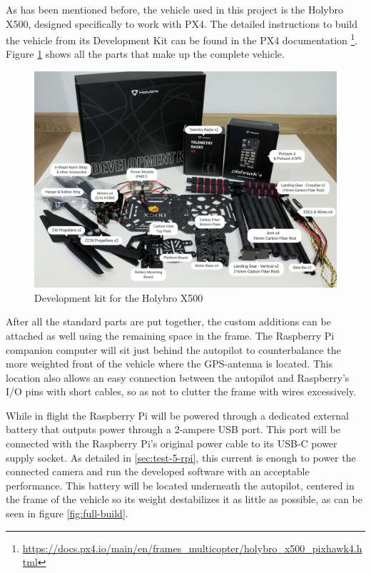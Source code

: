 

As has been mentioned before, the vehicle used in this project is the Holybro X500, designed specifically to work with PX4.
The detailed instructions to build the vehicle from its Development Kit can be found in the PX4 documentation \footnote{\url{https://docs.px4.io/main/en/frames_multicopter/holybro_x500_pixhawk4.html}}.
Figure \ref{fig:x500-dev-kit} shows all the parts that make up the complete vehicle.

\begin{figure}
  \centering
  \includegraphics[width=.6\textwidth, keepaspectratio]{img/x500-dev-kit.jpg}
  \caption{Development kit for the Holybro X500}\label{fig:x500-dev-kit}
\end{figure}


After all the standard parts are put together, the custom additions can be attached as well using the remaining space in the frame.
The Raspberry Pi companion computer will sit just behind the autopilot to counterbalance the more weighted front of the vehicle where the GPS-antenna is located.
This location also allows an easy connection between the autopilot and Raspberry's I/O pins with short cables, so as not to clutter the frame with wires excessively.

While in flight the Raspberry Pi will be powered through a dedicated external battery that outputs power through a 2-ampere USB port.
This port will be connected with the Raspberry Pi's original power cable to its USB-C power supply socket.
As detailed in \ref{sec:test-5-rpi}, this current is enough to power the connected camera and run the developed software with an acceptable performance.
This battery will be located underneath the autopilot, centered in the frame of the vehicle so its weight destabilizes it as little as possible, as can be seen in figure \ref{fig:full-build}.


